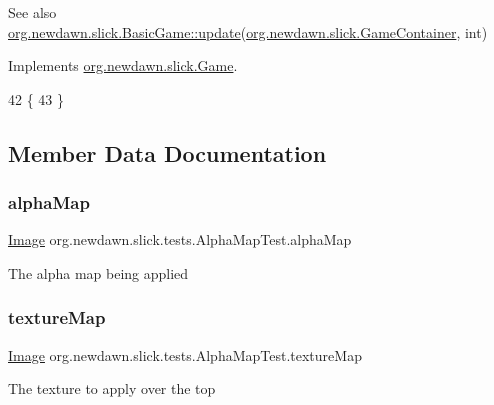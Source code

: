 \begin{DoxySeeAlso}{See also}
\mbox{\hyperlink{classorg_1_1newdawn_1_1slick_1_1_basic_game_acfe6fa05aef83bff1631af91a3e4bd20}{org.\+newdawn.\+slick.\+Basic\+Game\+::update}}(\mbox{\hyperlink{classorg_1_1newdawn_1_1slick_1_1_game_container}{org.\+newdawn.\+slick.\+Game\+Container}}, int) 
\end{DoxySeeAlso}


Implements \mbox{\hyperlink{interfaceorg_1_1newdawn_1_1slick_1_1_game_ab07b2e9463ee4631620dde0de25bdee8}{org.\+newdawn.\+slick.\+Game}}.


\begin{DoxyCode}
42                                   \{
43     \}
\end{DoxyCode}


\subsection{Member Data Documentation}
\mbox{\label{classorg_1_1newdawn_1_1slick_1_1tests_1_1_alpha_map_test_a1feaeb3164bd0e648d4f9cf7a63ce24a}} 
\subsubsection{\texorpdfstring{alpha\+Map}{alphaMap}}
{\footnotesize\ttfamily \mbox{\hyperlink{classorg_1_1newdawn_1_1slick_1_1_image}{Image}} org.\+newdawn.\+slick.\+tests.\+Alpha\+Map\+Test.\+alpha\+Map\hspace{0.3cm}{\ttfamily [private]}}

The alpha map being applied \mbox{\label{classorg_1_1newdawn_1_1slick_1_1tests_1_1_alpha_map_test_a1ba492928b78eceb9442f13fb61a45f3}} 
\subsubsection{\texorpdfstring{texture\+Map}{textureMap}}
{\footnotesize\ttfamily \mbox{\hyperlink{classorg_1_1newdawn_1_1slick_1_1_image}{Image}} org.\+newdawn.\+slick.\+tests.\+Alpha\+Map\+Test.\+texture\+Map\hspace{0.3cm}{\ttfamily [private]}}

The texture to apply over the top 